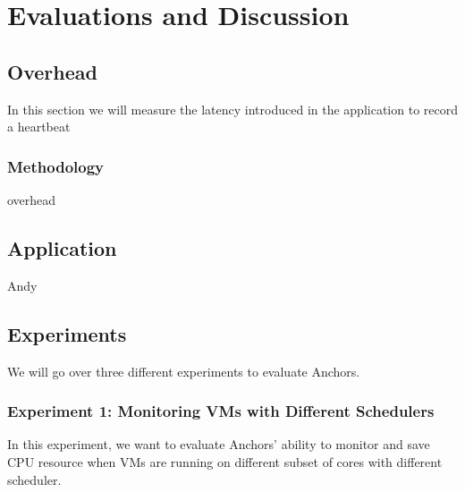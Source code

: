 \section{Evaluations and Discussion}



\subsection{Overhead}




In this section we will measure the latency introduced in the application to record a heartbeat

\subsubsection*{Methodology}



overhead

\subsection{Application}

Andy

\subsection{Experiments}

We will go over three different experiments to evaluate Anchors.

\subsubsection{Experiment 1: Monitoring VMs with Different Schedulers}

In this experiment, we want to evaluate Anchors' ability to monitor and save CPU resource when VMs are running on different subset of cores with different scheduler.


